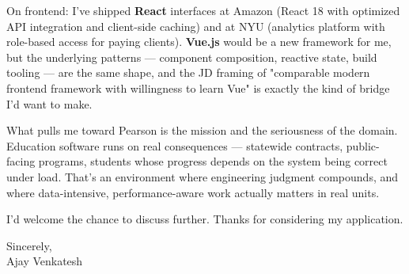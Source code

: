 \documentclass[letterpaper,11pt]{article}
\begin{document}
On frontend: I've shipped \textbf{React} interfaces at Amazon (React 18 with optimized API integration and client-side caching) and at NYU (analytics platform with role-based access for paying clients). \textbf{Vue.js} would be a new framework for me, but the underlying patterns --- component composition, reactive state, build tooling --- are the same shape, and the JD framing of "comparable modern frontend framework with willingness to learn Vue" is exactly the kind of bridge I'd want to make.

What pulls me toward Pearson is the mission and the seriousness of the domain. Education software runs on real consequences --- statewide contracts, public-facing programs, students whose progress depends on the system being correct under load. That's an environment where engineering judgment compounds, and where data-intensive, performance-aware work actually matters in real units.

I'd welcome the chance to discuss further. Thanks for considering my application.

\vspace{12pt}

Sincerely, \\
Ajay Venkatesh
\end{document}
